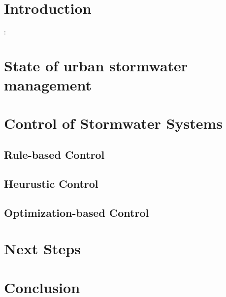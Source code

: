 \documentclass[article]{memoir}
\begin{document}
\section{Introduction}
:
\section{State of urban stormwater management}

\section{Control of Stormwater Systems}


\subsection{Rule-based Control}

\subsection{Heurustic Control}

\subsection{Optimization-based Control}

\section{Next Steps}
\section{Conclusion}
\end{document}
